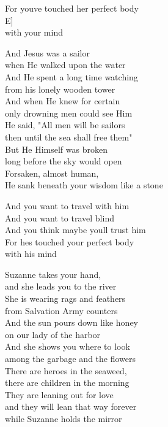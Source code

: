 \documentclass[
  letterpaper,
  a5paper]{memoir}
\begin{document}
For you\textquotesingle ve touched her perfect body~~~~~~~~~~~~~~~~~\\
\hspace*{0.333em}\hspace*{0.333em}\hspace*{0.333em}\hspace*{0.333em}\hspace*{0.333em}\hspace*{0.333em}\hspace*{0.333em}\hspace*{0.333em}\hspace*{0.333em}\hspace*{0.333em}{[}E{]}\\
with your mind

And Jesus was a sailor\\
when He walked upon the water\\
And He spent a long time watching\\
from his lonely wooden tower\\
And when He knew for certain\\
only drowning men could see Him\\
He said, "All men will be sailors\\
then until the sea shall free them"\\
But He Himself was broken\\
long before the sky would open\\
Forsaken, almost human,\\
He sank beneath your wisdom like a stone

And you want to travel with him\\
And you want to travel blind\\
And you think maybe you\textquotesingle ll trust him\\
For he\textquotesingle s touched your perfect body\\
with his mind

Suzanne takes your hand,\\
and she leads you to the river~~~\\
She is wearing rags and feathers\\
from Salvation Army counters\\
And the sun pours down like honey\\
on our lady of the harbor\\
And she shows you where to look\\
among the garbage and the flowers\\
There are heroes in the seaweed,\\
there are children in the morning~~~~\\
They are leaning out for love\\
and they will lean that way forever~~~\\
while Suzanne holds the mirror
\end{document}
